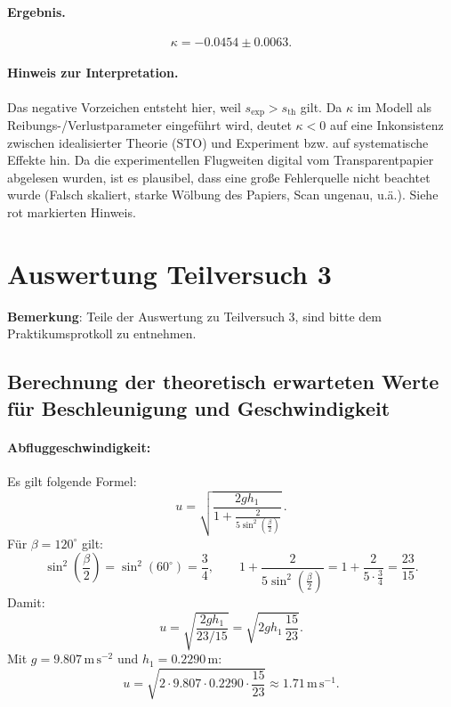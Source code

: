 \documentclass{article}
\begin{document}
\paragraph{Ergebnis.}
\begin{equation}
\kappa = -0.0454 \pm 0.0063.
\end{equation}

\paragraph{Hinweis zur Interpretation.}
Das negative Vorzeichen entsteht hier, weil \(s_\mathrm{exp}>s_\mathrm{th}\) gilt.
Da \(\kappa\) im Modell als Reibungs-/Verlustparameter eingeführt wird, deutet \(\kappa<0\)
auf eine Inkonsistenz zwischen idealisierter Theorie (STO) und Experiment bzw. auf
systematische Effekte hin. Da die experimentellen Flugweiten digital vom Transparentpapier abgelesen wurden, ist es plausibel, dass eine große Fehlerquelle nicht beachtet wurde (Falsch skaliert, starke Wölbung des Papiers, Scan ungenau, u.ä.). Siehe rot markierten Hinweis.

\newpage
\section{Auswertung Teilversuch 3}
\textbf{Bemerkung}: Teile der Auswertung zu Teilversuch 3, sind bitte dem Praktikumsprotkoll zu entnehmen.

\subsection{Berechnung der theoretisch erwarteten Werte für Beschleunigung und Geschwindigkeit}


\paragraph{Abfluggeschwindigkeit:}
Es gilt folgende Formel:
\begin{equation}
u
= \sqrt{\frac{2 g h_1}{1+\frac{2}{5\sin^{2}\!\left(\frac{\beta}{2}\right)}}}\,.
\end{equation}
Für $\beta=120^\circ$ gilt:
\begin{equation}
\sin^{2}\!\left(\frac{\beta}{2}\right)=\sin^{2}(60^\circ)=\frac{3}{4},
\qquad
1+\frac{2}{5\sin^{2}\!\left(\frac{\beta}{2}\right)}
=1+\frac{2}{5\cdot\frac{3}{4}}
=\frac{23}{15}.
\end{equation}
Damit:
\begin{equation}
u
=\sqrt{\frac{2 g h_1}{23/15}}
=\sqrt{2 g h_1\,\frac{15}{23}}.
\end{equation}
Mit $g=9.807\,\mathrm{m\,s^{-2}}$ und $h_1=0.2290\,\mathrm{m}$:
\begin{equation}
u
=\sqrt{2\cdot 9.807\cdot 0.2290\cdot \frac{15}{23}}
\approx 1.71\,\mathrm{m\,s^{-1}}.
\end{equation}
\end{document}
